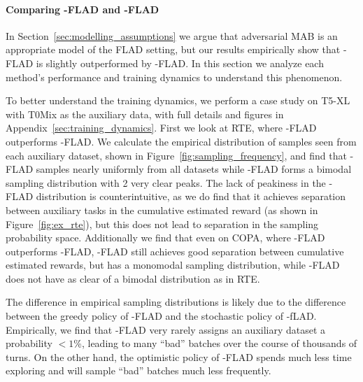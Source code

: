 \paragraph{Comparing \ex{}-FLAD and \ucb{}-FLAD}
In Section~\ref{sec:modelling_assumptions} we argue that adversarial MAB is an appropriate model of the FLAD setting, but our results empirically show that \ex{}-FLAD is slightly outperformed by \ucb{}-FLAD. In this section we analyze each method's performance and training dynamics to understand this phenomenon.

To better understand the training dynamics, we perform a case study on T5-XL with T0Mix as the auxiliary data, with full details and figures in Appendix~\ref{sec:training_dynamics}.
First we look at RTE, where \ucb{}-FLAD outperforms \ex{}-FLAD. We calculate the empirical distribution of samples seen from each auxiliary dataset, shown in Figure~\ref{fig:sampling_frequency}, and find that \ex{}-FLAD samples nearly uniformly from all datasets while \ucb{}-FLAD forms a bimodal sampling distribution with 2 very clear peaks.
The lack of peakiness in the \ex{}-FLAD distribution is counterintuitive, as we do find that it achieves separation between auxiliary tasks in the cumulative estimated reward (as shown in Figure~\ref{fig:ex_rte}), but this does not lead to separation in the sampling probability space. 
Additionally we find that even on COPA, where \ex{}-FLAD outperforms \ucb{}-FLAD, \ex{}-FLAD still achieves good separation between cumulative estimated rewards, but has a monomodal sampling distribution, while \ucb{}-FLAD does not have as clear of a bimodal distribution as in RTE.

The difference in empirical sampling distributions is likely due to the difference between the greedy policy of \ucb{}-FLAD and the stochastic policy of \ex{}-fLAD. Empirically, we find that \ex{}-FLAD very rarely assigns an auxiliary dataset a probability $<1$\%, leading to many ``bad'' batches over the course of thousands of turns. On the other hand, the optimistic policy of \ucb{}-FLAD spends much less time exploring and will sample ``bad'' batches much less frequently.


